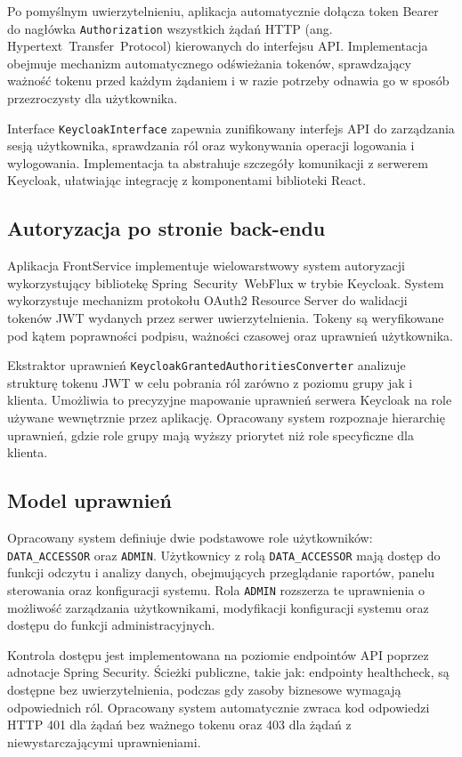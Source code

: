 Po pomyślnym uwierzytelnieniu, aplikacja automatycznie dołącza token Bearer do nagłówka \texttt{Authorization} wszystkich żądań HTTP (ang. \mbox{Hypertext Transfer Protocol}) kierowanych do interfejsu API. Implementacja obejmuje mechanizm automatycznego odświeżania tokenów, sprawdzający ważność tokenu przed każdym żądaniem i w razie potrzeby odnawia go w sposób przezroczysty dla użytkownika.

Interface \texttt{KeycloakInterface} zapewnia zunifikowany interfejs API do zarządzania sesją użytkownika, sprawdzania ról oraz wykonywania operacji logowania i wylogowania. Implementacja ta abstrahuje szczegóły komunikacji z serwerem Keycloak, ułatwiając integrację z komponentami biblioteki React.

\subsection{Autoryzacja po stronie back-endu}

Aplikacja FrontService implementuje wielowarstwowy system autoryzacji wykorzystujący bibliotekę \mbox{Spring Security WebFlux} w trybie Keycloak. System wykorzystuje mechanizm protokołu OAuth2 Resource Server do walidacji tokenów JWT wydanych przez serwer uwierzytelnienia. Tokeny są weryfikowane pod kątem poprawności podpisu, ważności czasowej oraz uprawnień użytkownika.

Ekstraktor uprawnień \texttt{KeycloakGrantedAuthoritiesConverter} analizuje strukturę tokenu JWT w celu pobrania ról zarówno z poziomu grupy jak i klienta. Umożliwia to precyzyjne mapowanie uprawnień serwera Keycloak na role używane wewnętrznie przez aplikację. Opracowany system rozpoznaje hierarchię uprawnień, gdzie role grupy mają wyższy priorytet niż role specyficzne dla klienta.

\subsection{Model uprawnień}

Opracowany system definiuje dwie podstawowe role użytkowników: \texttt{DATA\_ACCESSOR} oraz \texttt{ADMIN}. Użytkownicy z rolą \texttt{DATA\_ACCESSOR} mają dostęp do funkcji odczytu i analizy danych, obejmujących przeglądanie raportów, panelu sterowania oraz konfiguracji systemu. Rola \texttt{ADMIN} rozszerza te uprawnienia o możliwość zarządzania użytkownikami, modyfikacji konfiguracji systemu oraz dostępu do funkcji administracyjnych.

Kontrola dostępu jest implementowana na poziomie endpointów API poprzez adnotacje Spring Security. Ścieżki publiczne, takie jak: endpointy healthcheck, są dostępne bez uwierzytelnienia, podczas gdy zasoby biznesowe wymagają odpowiednich ról. Opracowany system automatycznie zwraca kod odpowiedzi HTTP 401 dla żądań bez ważnego tokenu oraz 403 dla żądań z niewystarczającymi uprawnieniami.

